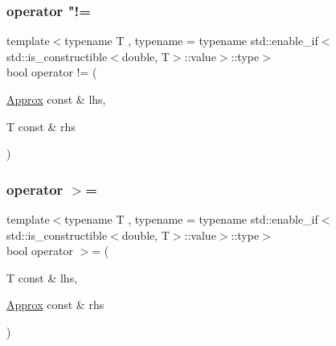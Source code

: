 \mbox{\label{class_catch_1_1_detail_1_1_approx_a0902653024d8e11e76632b2faa1f6bd5}} 
\subsubsection{\texorpdfstring{operator "!=}{operator !=}\hspace{0.1cm}{\footnotesize\ttfamily [2/2]}}
{\footnotesize\ttfamily template$<$typename T , typename  = typename std\+::enable\+\_\+if$<$std\+::is\+\_\+constructible$<$double, T$>$\+::value$>$\+::type$>$ \\
bool operator != (\begin{DoxyParamCaption}\item[{\mbox{\hyperlink{class_catch_1_1_detail_1_1_approx}{Approx}} const \&}]{lhs,  }\item[{T const \&}]{rhs }\end{DoxyParamCaption})\hspace{0.3cm}{\ttfamily [friend]}}

\mbox{\label{class_catch_1_1_detail_1_1_approx_ae68a144dad95cfe31786d2df0b25bb02}} 
\subsubsection{\texorpdfstring{operator $>$=}{operator >=}\hspace{0.1cm}{\footnotesize\ttfamily [1/2]}}
{\footnotesize\ttfamily template$<$typename T , typename  = typename std\+::enable\+\_\+if$<$std\+::is\+\_\+constructible$<$double, T$>$\+::value$>$\+::type$>$ \\
bool operator $>$= (\begin{DoxyParamCaption}\item[{T const \&}]{lhs,  }\item[{\mbox{\hyperlink{class_catch_1_1_detail_1_1_approx}{Approx}} const \&}]{rhs }\end{DoxyParamCaption})\hspace{0.3cm}{\ttfamily [friend]}}

\mbox{\label{class_catch_1_1_detail_1_1_approx_aef8dca60ba535199c0703e1e3a25562b}} 
